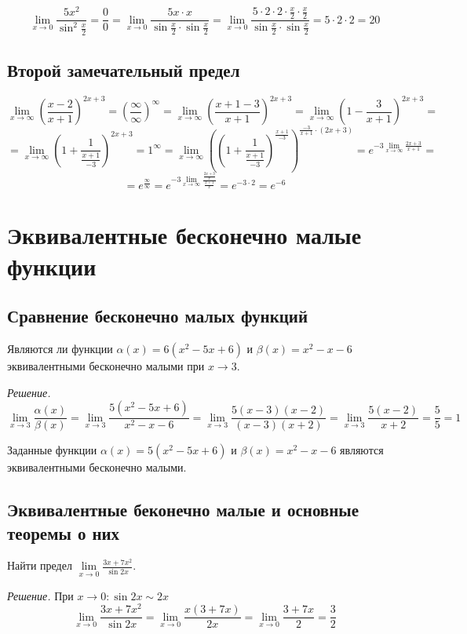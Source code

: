 \documentclass[14pt]{extreport}
\begin{document}
\begin{example}
$$\lim\limits_{x\to 0}\frac{5x^2}{\sin^2\frac{x}{2}}=\frac{0}{0}=\lim\limits_{x\to 0}\frac{5x\cdot x}{\sin\frac{x}{2}\cdot\sin\frac{x}{2}}=\lim\limits_{x\to 0}\frac{5\cdot2\cdot2\cdot\frac{x}{2}\cdot\frac{x}{2}}{\sin\frac{x}{2}\cdot\sin\frac{x}{2}}=5\cdot2\cdot2=20$$
\end{example}


\section{Второй замечательный предел}
\begin{example}
$$\lim\limits_{x\to\infty}\left(\frac{x-2}{x+1}\right)^{2x+3}=\left(\frac{\infty}{\infty}\right)^\infty= \lim\limits_{x\to\infty}\left(\frac{x+1-3}{x+1}\right)^{2x+3}=\lim\limits_{x\to\infty}\left(1-\frac{3}{x+1}\right)^{2x+3}=$$ $$=\lim\limits_{x\to\infty}\left(1+\frac{1}{\frac{x+1}{-3}}\right)^{2x+3}=1^\infty=\lim\limits_{x\to\infty}\left(\left(1+\frac{1}{\frac{x+1}{-3}}\right)^{\frac{x+1}{-3}}\right)^{\frac{-3}{x+1}\cdot(2x+3)}=e^{-3\lim\limits_{x\to\infty}\frac{2x+3}{x+1}}=$$ $$=e^{\frac{\infty}{\infty}}=e^{-3\lim\limits_{x\to\infty}\frac{\frac{2x+3}{x}}{\frac{x+1}{x}}}=e^{-3\cdot2}=e^{-6}$$
\end{example}


\chapter{Эквивалентные бесконечно малые функции}
\section{Сравнение бесконечно малых функций}
\begin{example}
Являются ли функции $\alpha(x)=6(x^2-5x+6)$ и $\beta(x)=x^2-x-6$ эквивалентными бесконечно малыми при $x\rightarrow 3$.

\emph{Решение.} $$\lim\limits_{x\to3}\frac{\alpha(x)}{\beta(x)}=\lim\limits_{x\to3}\frac{5(x^2-5x+6)}{x^2-x-6}=\lim\limits_{x\to3}\frac{5(x-3)(x-2)}{(x-3)(x+2)}=\lim\limits_{x\to3}\frac{5(x-2)}{x+2}=\frac{5}{5}=1$$

Заданные функции $\alpha(x)=5(x^2-5x+6)$ и $\beta(x)=x^2-x-6$ являются эквивалентными бесконечно малыми.
\end{example}


\section{Эквивалентные беконечно малые и основные теоремы о них}
\begin{example}Найти предел $\lim\limits_{x\to0}\frac{3x+7x^2}{\sin2x}.$

\emph{Решение.} При $x\rightarrow0:\sin2x\sim2x$
$$\lim\limits_{x\to0}\frac{3x+7x^2}{\sin2x}=\lim\limits_{x\to0}\frac{x(3+7x)}{2x}=\lim\limits_{x\to0}\frac{3+7x}{2}=\frac{3}{2}$$
\end{example}
\end{document}
